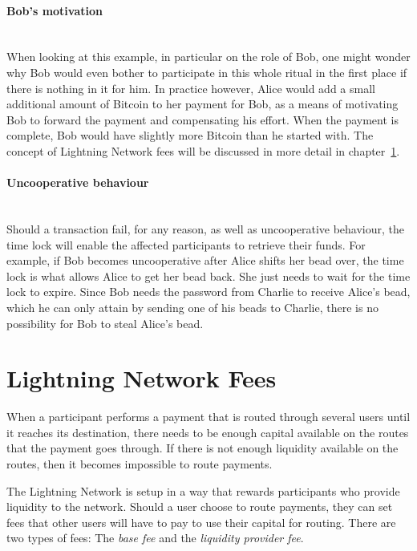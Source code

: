 \documentclass[a4paper, 12pt]{report}
\begin{document}
\paragraph{Bob’s motivation} \hspace{0pt} \\
When looking at this example, in particular on the role of Bob, one might wonder why Bob would even bother to participate in this whole ritual in the first place if there is nothing in it for him. In practice however, Alice would add a small additional amount of Bitcoin to her payment for Bob, as a means of motivating Bob to forward the payment and compensating his effort. When the payment is complete, Bob would have slightly more Bitcoin than he started with. The concept of Lightning Network fees will be discussed in more detail in chapter~\ref{sec:Lightning_Network_Fees}.

\paragraph{Uncooperative behaviour} \hspace{0pt} \\
Should a transaction fail, for any reason, as well as uncooperative behaviour, the time lock will enable the affected participants to retrieve their funds. For example, if Bob becomes uncooperative after Alice shifts her bead over, the time lock is what allows Alice to get her bead back. She just needs to wait for the time lock to expire. Since Bob needs the password from Charlie to receive Alice’s bead, which he can only attain by sending one of his beads to Charlie, there is no possibility for Bob to steal Alice’s bead.

\section{Lightning Network Fees} \label{sec:Lightning_Network_Fees}

\par When a participant performs a payment that is routed through several users until it reaches its destination, there needs to be enough capital available on the routes that the payment goes through. If there is not enough liquidity available on the routes, then it becomes impossible to route payments.

\par The Lightning Network is setup in a way that rewards participants who provide liquidity to the network. Should a user choose to route payments, they can set fees that other users will have to pay to use their capital for routing.\newline
There are two types of fees: The \textit{base fee} and the \textit{liquidity provider fee}.\cite{chris}
\end{document}
